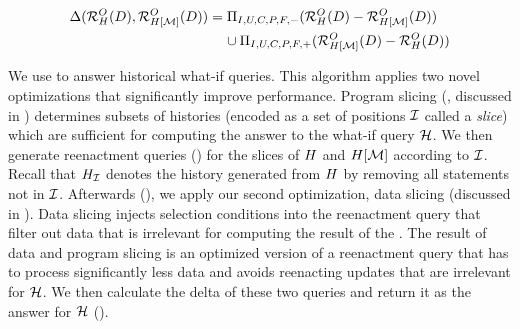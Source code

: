 \begin{align*}
  \Delta(\mathcal{R}^{O}_{H}(D),\mathcal{R}^{O}_{H[\mathcal{M}]}(D))&=  \Pi_{I,U,C,P,F,-}(\mathcal{R}^{O}_{H}(D)- \mathcal{R}^{O}_{H[\mathcal{M}]}(D))\\
                                                                            &\hspace{4mm}  \cup \Pi_{I,U,C,P,F,+}(\mathcal{R}^{O}_{H[\mathcal{M}]}(D)-\mathcal{R}^{O}_{H}(D))
\end{align*}

We use  to answer historical what-if queries. This algorithm applies two novel optimizations that significantly improve  performance. Program slicing (, discussed in )  determines subsets of histories (encoded as a set of positions $\mathcal{I}$ called a \emph{slice}) which are sufficient for computing the answer to the what-if query $\mathcal{H}$. We then generate reenactment queries ()  for the slices of $H$ and $H[\mathcal{M}]$ according to $\mathcal{I}$. Recall that ${H}_{\mathcal{I}}$ denotes the history generated from $H$ by removing all statements not in $\mathcal{I}$. Afterwards (), we apply our second optimization, data slicing (discussed in ). Data slicing injects selection conditions into the reenactment query that filter out data that is irrelevant for computing the result of the \abbrHW. The result of data and program slicing is an optimized version of a reenactment query that has to process significantly less data and avoids reenacting updates that are irrelevant for $\mathcal{H}$. We then calculate the delta of these two queries and return it as the answer for $\mathcal{H}$ ().







